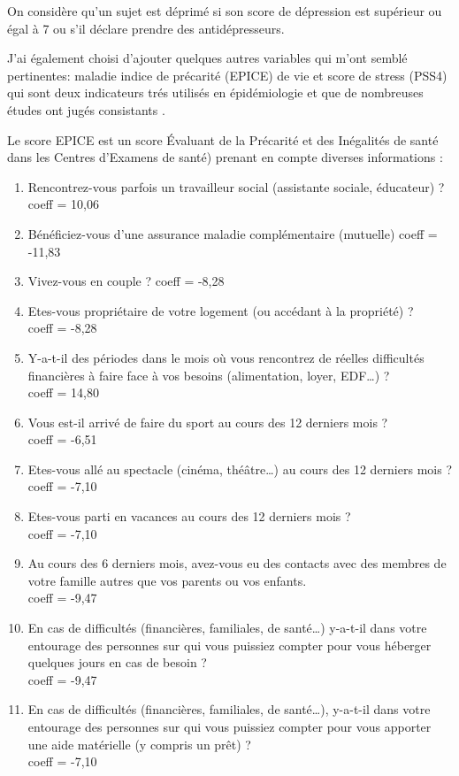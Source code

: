 \documentclass{book}
\begin{document}
\noindent
On considère qu'un sujet est déprimé si son score de dépression est supérieur ou égal à 7 ou s'il déclare prendre des antidépresseurs.\\

\smallskip

\noindent
J'ai également choisi d'ajouter quelques autres variables qui m'ont semblé pertinentes: maladie indice de précarité (EPICE) de vie et score de stress (PSS4) qui sont deux indicateurs trés utilisés en épidémiologie et que de nombreuses études ont jugés consistants \cite{warttig_new_2013} \cite{sass_comparaison_2006}.

\bigskip
\noindent
Le score EPICE est un score Évaluant de la Précarité et des Inégalités de santé dans les Centres d'Examens
de santé) prenant en compte diverses informations :
\begin{enumerate}
\item Rencontrez-vous parfois un travailleur social (assistante sociale, éducateur) ?\\
coeff = 10,06
\item Bénéficiez-vous d'une assurance maladie complémentaire (mutuelle) coeff = -11,83
\item Vivez-vous en couple ? coeff = -8,28
\item Etes-vous propriétaire de votre logement (ou accédant à la propriété) ?\\
coeff = -8,28
\item Y-a-t-il des périodes dans le mois où vous rencontrez de réelles difficultés financières à faire face à vos besoins (alimentation, loyer, EDF…) ?\\
coeff = 14,80
\item Vous est-il arrivé de faire du sport au cours des 12 derniers mois ?\\
coeff = -6,51
\item Etes-vous allé au spectacle (cinéma, théâtre…) au cours des 12 derniers mois ?\\
coeff = -7,10
\item Etes-vous parti en vacances au cours des 12 derniers mois ?\\
coeff = -7,10
\item Au cours des 6 derniers mois, avez-vous eu des contacts avec des membres de votre famille autres que vos parents ou vos enfants.\\
coeff = -9,47
\item En cas de difficultés (financières, familiales, de santé…) y-a-t-il dans votre entourage des personnes sur qui vous puissiez compter pour vous héberger quelques jours en cas de besoin ?\\
coeff = -9,47
\item En cas de difficultés (financières, familiales, de santé…), y-a-t-il dans votre entourage des personnes sur qui vous puissiez compter pour vous apporter une aide matérielle (y compris un prêt) ?\\
coeff = -7,10
\end{enumerate}
\end{document}
